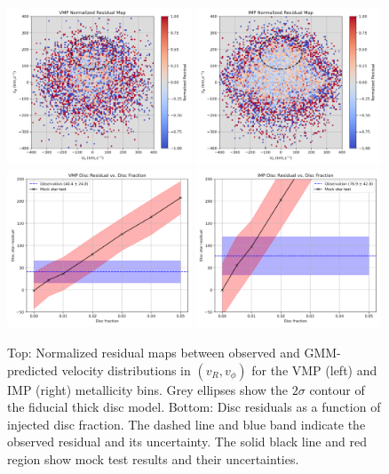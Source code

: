 \documentclass[a4paper,12pt]{article}
\begin{document}
\begin{figure}[ht]
    \centering
    \includegraphics[width=0.49\textwidth]{../figures/vmp_residual_map.png}
    \includegraphics[width=0.49\textwidth]{../figures/imp_residual_map.png} \\
    \includegraphics[width=0.49\textwidth]{../figures/vmp_disc_fraction.png}
    \includegraphics[width=0.49\textwidth]{../figures/imp_disc_fraction.png}
    \caption{Top: Normalized residual maps between observed and GMM-predicted velocity distributions in $(v_R, v_\phi)$ for the VMP (left) and IMP (right) metallicity bins. Grey ellipses show the $2\sigma$ contour of the fiducial thick disc model. Bottom: Disc residuals as a function of injected disc fraction. The dashed line and blue band indicate the observed residual and its uncertainty. The solid black line and red region show mock test results and their uncertainties.}
    \label{fig:residuals}
\end{figure}
\end{document}
